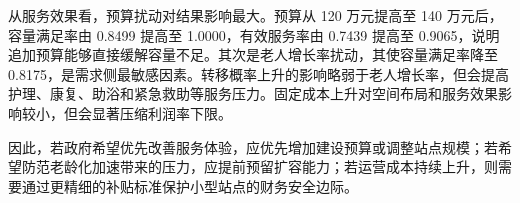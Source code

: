 从服务效果看，预算扰动对结果影响最大。预算从 120 万元提高至 140 万元后，容量满足率由 0.8499 提高至 1.0000，有效服务率由 0.7439 提高至 0.9065，说明追加预算能够直接缓解容量不足。其次是老人增长率扰动，其使容量满足率降至 0.8175，是需求侧最敏感因素。转移概率上升的影响略弱于老人增长率，但会提高护理、康复、助浴和紧急救助等服务压力。固定成本上升对空间布局和服务效果影响较小，但会显著压缩利润率下限。

因此，若政府希望优先改善服务体验，应优先增加建设预算或调整站点规模；若希望防范老龄化加速带来的压力，应提前预留扩容能力；若运营成本持续上升，则需要通过更精细的补贴标准保护小型站点的财务安全边际。